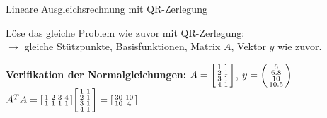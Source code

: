 \begin{example2}{Lineare Ausgleichsrechnung mit QR-Zerlegung}

Löse das gleiche Problem wie zuvor mit QR-Zerlegung:\\
$\rightarrow$ gleiche Stützpunkte, Basisfunktionen, Matrix $A$, Vektor $y$ wie zuvor.



\textbf{Verifikation der Normalgleichungen:}
$A = \begin{bsmallmatrix} 1 & 1 \\ 2 & 1 \\ 3 & 1 \\ 4 & 1 \end{bsmallmatrix}$, $y = \begin{psmallmatrix} 6 \\ 6.8 \\ 10 \\ 10.5 \end{psmallmatrix}$
\vspace{-2mm}\\
$A^T A = \begin{bsmallmatrix} 1 & 2 & 3 & 4 \\ 1 & 1 & 1 & 1 \end{bsmallmatrix} \begin{bsmallmatrix} 1 & 1 \\ 2 & 1 \\ 3 & 1 \\ 4 & 1 \end{bsmallmatrix} = \begin{bsmallmatrix} 30 & 10 \\ 10 & 4 \end{bsmallmatrix}$


\end{example2}
